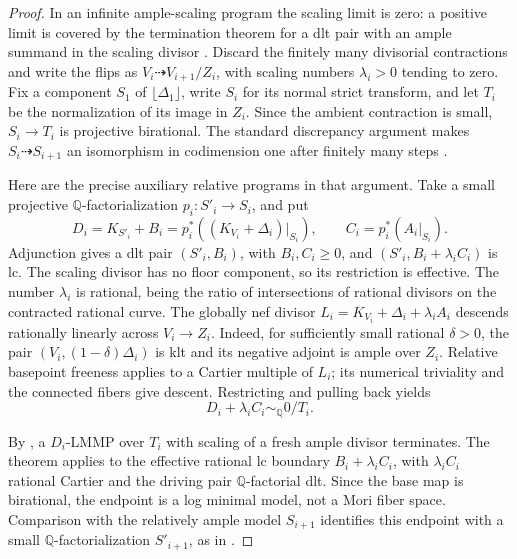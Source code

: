 \documentclass[11pt,letterpaper]{article}
\theoremstyle{definition}
\theoremstyle{remark}
\begin{document}
\begin{proof}
In an infinite ample-scaling program the scaling limit is zero:
a positive limit is covered by the termination theorem for a
dlt pair with an ample summand in the scaling divisor
\cite[Theorem~1.9(ii), equivalently Theorem~4.1(ii)]
{Proj-Birkar2012Special}. Discard the finitely many divisorial
contractions and write the flips as \(V_i\dashrightarrow V_{i+1}/Z_i\),
with scaling numbers \(\lambda_i>0\) tending to zero.
Fix a component \(S_1\) of \(\lfloor\Delta_1\rfloor\), write
\(S_i\) for its normal strict transform, and let \(T_i\) be the
normalization of its image in \(Z_i\). Since the ambient contraction
is small, \(S_i\to T_i\) is projective birational. The standard
discrepancy argument makes \(S_i\dashrightarrow S_{i+1}\)
an isomorphism in codimension one after finitely many steps
\cite[proof of Lemma~3.6]{Proj-Birkar2010}.

Here are the precise auxiliary relative programs in that argument.
Take a small projective \(\mathbb{Q}\)-factorialization
\(p_i:S'_i\to S_i\), and put
\[
 D_i=K_{S'_i}+B_i=p_i^*((K_{V_i}+\Delta_i)|_{S_i}),
 \qquad C_i=p_i^*(A_i|_{S_i}).
\]
Adjunction gives a dlt pair \((S'_i,B_i)\), with \(B_i,C_i\geq0\),
and \((S'_i,B_i+\lambda_i C_i)\) is lc. The scaling divisor
has no floor component, so its restriction is effective.
The number \(\lambda_i\) is rational, being the ratio of
intersections of rational divisors on the contracted rational curve.
The globally nef divisor
\(L_i=K_{V_i}+\Delta_i+\lambda_i A_i\) descends rationally
linearly across \(V_i\to Z_i\). Indeed, for sufficiently small
rational \(\delta>0\), the pair
\((V_i,(1-\delta)\Delta_i)\) is klt and its negative adjoint
is ample over \(Z_i\). Relative basepoint freeness applies to a
Cartier multiple of \(L_i\); its numerical triviality and the
connected fibers give descent. Restricting and pulling back yields
\[
 D_i+\lambda_i C_i\sim_{\mathbb{Q}}0/T_i.
\]

By \cite[Theorem~1.1(3)]{Proj-Birkar2012Special}, a \(D_i\)-LMMP
over \(T_i\) with scaling of a fresh ample divisor terminates.
The theorem applies to the effective rational lc boundary
\(B_i+\lambda_i C_i\), with \(\lambda_i C_i\) rational Cartier
and the driving pair \(\mathbb{Q}\)-factorial dlt. Since the base map
is birational, the endpoint is a log minimal model, not a Mori
fiber space. Comparison with the relatively ample model
\(S_{i+1}\) identifies this endpoint with a small
\(\mathbb{Q}\)-factorialization \(S'_{i+1}\), as in
\cite[Remarks~2.9--2.10]{Proj-Birkar2012Special}.


\end{proof}
\end{document}
